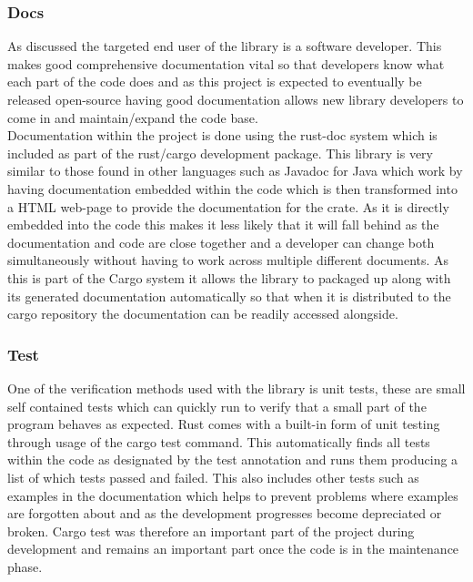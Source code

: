 \documentclass[11pt,a4paper]{article}
\begin{document}
\subsubsection{Docs}
As discussed the targeted end user of the library is a software developer. This makes good comprehensive documentation vital so that developers know what each part of the code does and as this project is expected to eventually be released open-source having good documentation allows new library developers to come in and maintain/expand the code base.\\

Documentation within the project is done using the rust-doc system which is included as part of the rust/cargo development package. This library is very similar to those found in other languages such as Javadoc for Java which work by having documentation embedded within the code which is then transformed into a HTML web-page to provide the documentation for the crate. As it is directly embedded into the code this makes it less likely that it will fall behind as the documentation and code are close together and a developer can change both simultaneously without having to work across multiple different documents. As this is part of the Cargo system it allows the library to packaged up along with its generated documentation automatically so that when it is distributed to the cargo repository the documentation can be readily accessed alongside.

\subsubsection{Test}
One of the verification methods used with the library is unit tests, these are small self contained tests which can quickly run to verify that a small part of the program behaves as expected. Rust comes with a built-in form of unit testing through usage of the cargo test command. This automatically finds all tests within the code as designated by the test annotation and runs them producing a list of which tests passed and failed. This also includes other tests such as examples in the documentation which helps to prevent problems where examples are forgotten about and as the development progresses become depreciated or broken. Cargo test was therefore an important part of the project during development and remains an important part once the code is in the maintenance phase.
\end{document}
